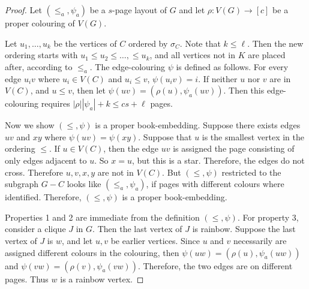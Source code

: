 \begin{proof}
	Let \((\leq_a, \psi_a)\) be a \(s\)-page layout of \(G\) and let \(\rho: V(G) \rightarrow [c]\) be a proper colouring of \(V(G)\).

	Let \(u_1, \ldots, u_k\) be the vertices of \(C\) ordered by \(\sigma_C\). Note that \(k \leq \ell\). Then the new ordering starts with \(u_1 \leq u_2 \leq \ldots, \leq u_k\), and all vertices not in \(K\) are placed after, according to \(\leq_a\).
	The edge-colouring \(\psi\) is defined as follows. For every edge \(u_i v\) where \(u_i \in V(C)\) and \(u_i \leq v\), \(\psi(u_i v) = i\). If neither \(u\) nor \(v\) are in \(V(C)\), and \(u \leq v\), then let \(\psi(uv) = (\rho(u), \psi_a(uv))\). Then this edge-colouring requires \(|\rho| |\psi_a| + k \leq cs + \ell\) pages.

	Now we show \((\leq, \psi)\) is a proper book-embedding. Suppose there exists edges \(uv\) and \(xy\) where \(\psi(uv) = \psi(xy)\). Suppose that \(u\) is the smallest vertex in the ordering \(\leq\). If \(u \in V(C)\), then the edge \(uv\) is assigned the page consisting of only edges adjacent to $u$. So \(x = u\), but this is a star. Therefore, the edges do not cross. Therefore \(u, v, x, y\) are not in \(V(C)\). But \((\leq, \psi)\) restricted to the subgraph $G - C$ looks like \((\leq_a, \psi_a)\), if pages with different colours where identified. Therefore, \((\leq, \psi)\) is a proper book-embedding.  
	\par
	Properties 1 and 2 are immediate from the definition \((\leq, \psi)\). For property 3, consider a clique \(J\) in \(G\). Then the last vertex of \(J\) is rainbow. Suppose the last vertex of \(J\) is \(w\), and let \(u, v\) be earlier vertices. Since \(u\) and \(v\) necessarily are assigned different colours in the colouring, then \(\psi(uw) = (\rho(u), \psi_a(uw))\) and \(\psi(vw) = (\rho(v), \psi_a(vw))\). Therefore, the two edges are on different pages. Thus \(w\) is a rainbow vertex.
\end{proof}

